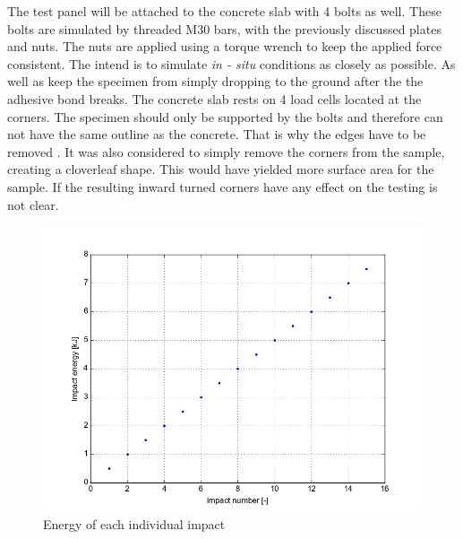 The test panel will be attached to the concrete slab with 4 bolts as well. These bolts are simulated by threaded M30 bars, with the previously discussed plates and nuts. The nuts are applied using a torque wrench to keep the applied force consistent. %
The intend is to simulate \textit{in - situ} conditions as closely as possible. As well as keep the specimen from simply dropping to the ground after the the adhesive bond breaks. The concrete slab rests on 4 load cells located at the corners. The specimen should only be supported by the bolts and therefore can not have the same outline as the concrete. That is why the edges have to be removed .%
It was also considered to simply remove the corners from the sample, creating a cloverleaf shape. This would have yielded more surface area for the sample. If the resulting inward turned corners have any effect on the testing is not clear.


\begin{figure}
    \centering
    \includegraphics[width = 0.95\linewidth]{pics/impact_energy.png}
    \caption{Energy of each individual impact}
    \label{fig:impactenergy}
\end{figure}


